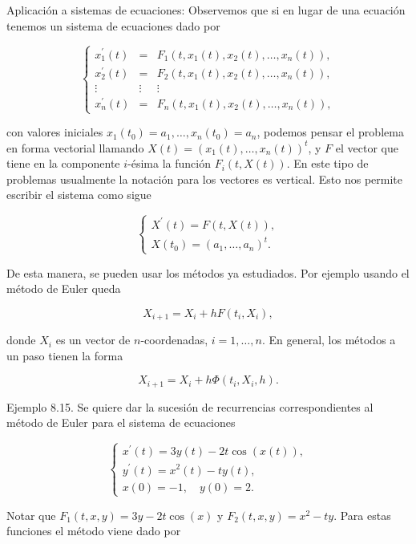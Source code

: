 \documentclass[10pt]{article}
\begin{document}
Aplicación a sistemas de ecuaciones: Observemos que si en lugar de una ecuación tenemos un sistema de ecuaciones dado por

$$
\left\{\begin{array}{ccc}
x_{1}^{\prime}(t) & = & F_{1}\left(t, x_{1}(t), x_{2}(t), \ldots, x_{n}(t)\right), \\
x_{2}^{\prime}(t) & = & F_{2}\left(t, x_{1}(t), x_{2}(t), \ldots, x_{n}(t)\right), \\
\vdots & \vdots & \vdots \\
x_{n}^{\prime}(t) & = & F_{n}\left(t, x_{1}(t), x_{2}(t), \ldots, x_{n}(t)\right),
\end{array}\right.
$$

con valores iniciales $x_{1}\left(t_{0}\right)=a_{1}, \ldots, x_{n}\left(t_{0}\right)=a_{n}$, podemos pensar el problema en forma vectorial llamando $X(t)=\left(x_{1}(t), \ldots, x_{n}(t)\right)^{t}$, y $F$ el vector que tiene en la componente $i$-ésima la función $F_{i}(t, X(t))$. En este tipo de problemas usualmente la notación para los vectores es vertical. Esto nos permite escribir el sistema como sigue

$$
\left\{\begin{array}{l}
X^{\prime}(t)=F(t, X(t)), \\
X\left(t_{0}\right)=\left(a_{1}, \ldots, a_{n}\right)^{t} .
\end{array}\right.
$$

De esta manera, se pueden usar los métodos ya estudiados. Por ejemplo usando el método de Euler queda

$$
X_{i+1}=X_{i}+h F\left(t_{i}, X_{i}\right),
$$

donde $X_{i}$ es un vector de $n$-coordenadas, $i=1, \ldots, n$. En general, los métodos a un paso tienen la forma

$$
X_{i+1}=X_{i}+h \Phi\left(t_{i}, X_{i}, h\right) .
$$

Ejemplo 8.15. Se quiere dar la sucesión de recurrencias correspondientes al método de Euler para el sistema de ecuaciones

$$
\left\{\begin{array}{l}
x^{\prime}(t)=3 y(t)-2 t \cos (x(t)), \\
y^{\prime}(t)=x^{2}(t)-t y(t), \\
x(0)=-1, \quad y(0)=2 .
\end{array}\right.
$$

Notar que $F_{1}(t, x, y)=3 y-2 t \cos (x)$ y $F_{2}(t, x, y)=x^{2}-t y$. Para estas funciones el método viene dado por
\end{document}
